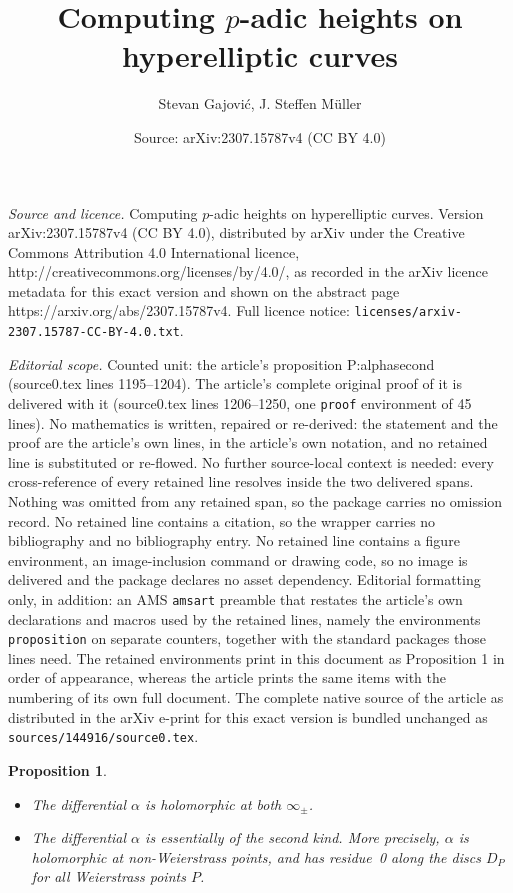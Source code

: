 \documentclass[10pt,a4paper]{amsart}
\title{Computing $p$-adic heights on hyperelliptic curves}
\author{Stevan Gajovi\'c, J. Steffen M\"uller}
\date{Source: arXiv:2307.15787v4 (CC BY 4.0)}
\newtheorem{proposition}{Proposition}
\newcommand{\sg}{{}}
\begin{document}
\maketitle

\noindent\emph{Source and licence.} Computing $p$-adic heights on hyperelliptic curves. Version arXiv:2307.15787v4 (CC BY 4.0), distributed by arXiv under the Creative Commons Attribution 4.0 International licence, http://creativecommons.org/licenses/by/4.0/, as recorded in the arXiv licence metadata for this exact version and shown on the abstract page https://arxiv.org/abs/2307.15787v4. Full licence notice: \texttt{licenses/arxiv-2307.15787-CC-BY-4.0.txt}.\par\smallskip

\noindent\textit{Editorial scope.} Counted unit: the article's proposition P:alphasecond (source0.tex lines 1195--1204). The article's complete original proof of it is delivered with it (source0.tex lines 1206--1250, one \texttt{proof} environment of 45 lines). No mathematics is written, repaired or re-derived: the statement and the proof are the article's own lines, in the article's own notation, and no retained line is substituted or re-flowed.  No further source-local context is needed: every cross-reference of every retained line resolves inside the two delivered spans.  Nothing was omitted from any retained span, so the package carries no omission record.  No retained line contains a citation, so the wrapper carries no bibliography and no bibliography entry.  No retained line contains a figure environment, an image-inclusion command or drawing code, so no image is delivered and the package declares no asset dependency.  Editorial formatting only, in addition: an AMS \texttt{amsart} preamble that restates the article's own declarations and macros used by the retained lines, namely the environments \texttt{proposition} on separate counters, together with the standard packages those lines need.  The retained environments print in this document as Proposition 1 in order of appearance, whereas the article prints the same items with the numbering of its own full document.  The complete native source of the article as distributed in the arXiv e-print for this exact version is bundled unchanged as \texttt{sources/144916/source0.tex}.
\begin{proposition}\label{P:alphasecond}\hfill
\begin{itemize}
\item[(a)] The differential $\alpha$ is holomorphic at both $\infty_{\pm}$.
\item[(b)] \sg{The
  differential $\alpha$ is essentially of the second kind. More precisely,
    $\alpha$ is holomorphic at non-Weierstrass points, and has  residue~0
    along the discs $D_P$ for all Weierstrass points $P$.} 
\end{itemize} 
\end{proposition}
\end{document}
